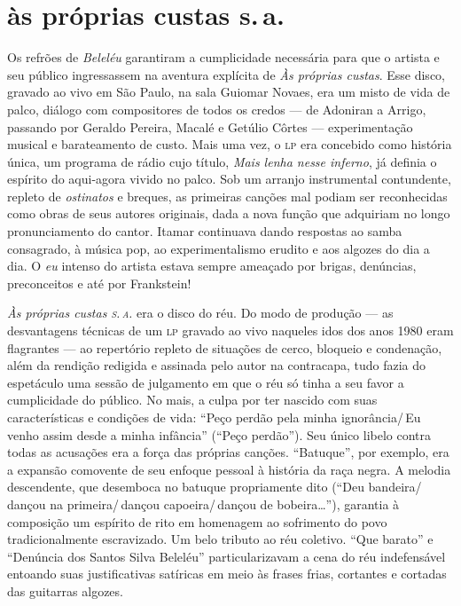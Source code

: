 \section{às próprias custas s.\,a.}

Os refrões de \textit{Beleléu} garantiram a cumplicidade necessária para que o
artista e seu público ingressassem na aventura explícita de \textit{Às próprias
custas}. Esse disco, gravado ao vivo em São Paulo, na sala Guiomar
Novaes, era um misto de vida de palco, diálogo com compositores de todos
os credos --- de Adoniran a Arrigo, passando por Geraldo Pereira, Macalé e
Getúlio Côrtes --- experimentação musical e barateamento de custo. Mais
uma vez, o \textsc{lp} era concebido como história única, um programa de rádio
cujo título, \textit{Mais lenha nesse inferno}, já definia o espírito do
aqui-agora vivido no palco. Sob um arranjo instrumental contundente,
repleto de \textit{ostinatos} e breques, as primeiras canções mal podiam ser
reconhecidas como obras de seus autores originais, dada a nova função
que adquiriam no longo pronunciamento do cantor. Itamar continuava
dando respostas ao samba consagrado, à música pop, ao experimentalismo
erudito e aos algozes do dia a dia. O \textit{eu} intenso do artista estava
sempre ameaçado por brigas, denúncias, preconceitos e até por
Frankstein!

\textit{Às próprias custas \textsc{s.\,a.}} era o disco do réu. Do modo de produção --- as
desvantagens técnicas de um \textsc{lp} gravado ao vivo naqueles idos dos anos
1980 eram flagrantes --- ao repertório repleto de situações de cerco,
bloqueio e condenação, além da rendição redigida e assinada pelo autor
na contracapa, tudo fazia do espetáculo uma sessão de julgamento em que
o réu só tinha a seu favor a cumplicidade do público. No mais, a culpa
por ter nascido com suas características e condições de vida: ``Peço
perdão pela minha ignorância/\,Eu venho assim desde a minha infância''
(``Peço perdão''). Seu único libelo contra todas as acusações era a força
das próprias canções. ``Batuque'', por exemplo, era a expansão comovente de
seu enfoque pessoal à história da raça negra. A melodia descendente, que
desemboca no batuque propriamente dito (``Deu bandeira/\,dançou na
primeira/\,dançou capoeira/\,dançou de bobeira\ldots''), garantia à
composição um espírito de rito em homenagem ao sofrimento do povo
tradicionalmente escravizado. Um belo tributo ao réu coletivo. ``Que
barato'' e ``Denúncia dos Santos Silva Beleléu'' particularizavam a cena do
réu indefensável entoando suas justificativas satíricas em meio às
frases frias, cortantes e cortadas das guitarras algozes.

